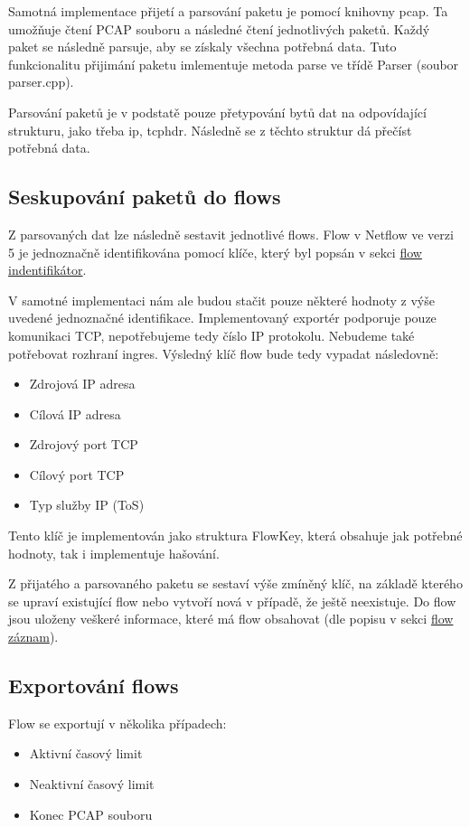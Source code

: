\documentclass{article}
\begin{document}
Samotná implementace přijetí a parsování paketu je pomocí knihovny pcap. Ta
umožňuje čtení PCAP souboru a následné čtení jednotlivých paketů. Každý paket
se následně parsuje, aby se získaly všechna potřebná data. Tuto funkcionalitu
přijimání paketu imlementuje metoda parse ve třídě Parser (soubor parser.cpp).

Parsování paketů je v podstatě pouze přetypování bytů dat na odpovídající
strukturu, jako třeba ip, tcphdr. Následně se z těchto struktur dá přečíst
potřebná data.

\subsection{Seskupování paketů do flows}

Z parsovaných dat lze následně sestavit jednotlivé flows. Flow v Netflow ve
verzi 5 je jednoznačně identifikována pomocí klíče, který byl popsán v sekci
\hyperref[sec:flow-key]{flow indentifikátor}.

V samotné implementaci nám ale budou stačit pouze některé hodnoty z výše
uvedené jednoznačné identifikace. Implementovaný exportér podporuje pouze
komunikaci TCP, nepotřebujeme tedy číslo IP protokolu. Nebudeme také potřebovat
rozhraní ingres. Výsledný klíč flow bude tedy vypadat následovně:
\begin{itemize}
    \item Zdrojová IP adresa
    \item Cílová IP adresa
    \item Zdrojový port TCP
    \item Cílový port TCP
    \item Typ služby IP (ToS)
\end{itemize}

Tento klíč je implementován jako struktura FlowKey, která obsahuje jak potřebné
hodnoty, tak i implementuje hašování.

Z přijatého a parsovaného paketu se sestaví výše zmíněný klíč, na základě
kterého se upraví existující flow nebo vytvoří nová v případě, že ještě
neexistuje. Do flow jsou uloženy veškeré informace, které má flow obsahovat
(dle popisu v sekci \hyperref[sec:flow-record]{flow záznam}).

\subsection{Exportování flows}

Flow se exportují v několika případech:
\begin{itemize}
    \item Aktivní časový limit
    \item Neaktivní časový limit
    \item Konec PCAP souboru
\end{itemize}
\end{document}
